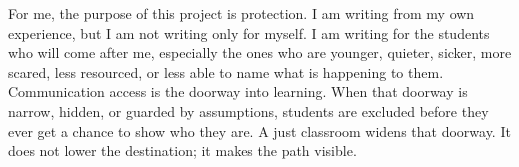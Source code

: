 \documentclass[11pt]{article}
\newcommand{\placeholderfigure}[3]{%
\begin{figure}[H]
\centering
\fcolorbox{PrimaryRed}{SoftBlue}{%
\begin{minipage}[c][2.25in][c]{0.88\linewidth}
\centering
\textbf{Figure Placeholder}\\[0.45em]
#2\\[0.45em]
\small #3
\end{minipage}}
\caption{#1}
\label{fig:#1}
\end{figure}}
\begin{document}
For me, the purpose of this project is protection. I am writing from my own experience, but I am not writing only for myself. I am writing for the students who will come after me, especially the ones who are younger, quieter, sicker, more scared, less resourced, or less able to name what is happening to them. Communication access is the doorway into learning. When that doorway is narrow, hidden, or guarded by assumptions, students are excluded before they ever get a chance to show who they are. A just classroom widens that doorway. It does not lower the destination; it makes the path visible.


\newpage







\end{document}
